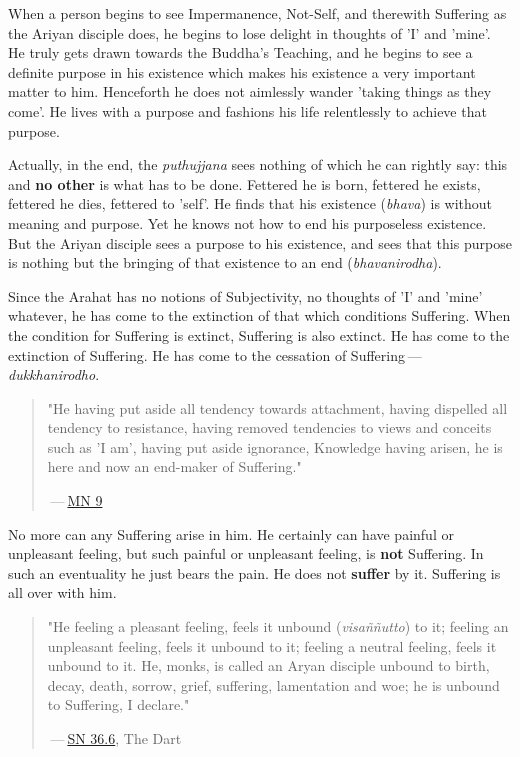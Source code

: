 When a person begins to see Impermanence, Not-Self, and therewith Suffering as the Ariyan disciple does, he begins to lose delight in thoughts of 'I' and 'mine'. He truly gets drawn towards the Buddha's Teaching, and he begins to see a definite purpose in his existence which makes his existence a very important matter to him. Henceforth he does not aimlessly wander 'taking things as they come'. He lives with a purpose and fashions his life relentlessly to achieve that purpose.

Actually, in the end, the \emph{puthujjana} sees nothing of which he can rightly say: this and \textbf{no other} is what has to be done. Fettered he is born, fettered he exists, fettered he dies, fettered to 'self'. He finds that his existence (\emph{bhava}) is without meaning and purpose. Yet he knows not how to end his purposeless existence. But the Ariyan disciple sees a purpose to his existence, and sees that this purpose is nothing but the bringing of that existence to an end (\emph{bhavanirodha}).

Since the Arahat has no notions of Subjectivity, no thoughts of 'I' and 'mine' whatever, he has come to the extinction of that which conditions Suffering. When the condition for Suffering is extinct, Suffering is also extinct. He has come to the extinction of Suffering. He has come to the cessation of Suffering --- \emph{dukkhanirodho}.

\begin{quote}
"He having put aside all tendency towards attachment, having dispelled all tendency to resistance, having removed tendencies to views and conceits such as 'I am', having put aside ignorance, Knowledge having arisen, he is here and now an end-maker of Suffering."

 --- \href{https://suttacentral.net/mn9/en/bodhi}{MN 9}
\end{quote}

No more can any Suffering arise in him. He certainly can have painful or unpleasant feeling, but such painful or unpleasant feeling, is \textbf{not} Suffering. In such an eventuality he just bears the pain. He does not \textbf{suffer} by it. Suffering is all over with him.

\begin{quote}
"He feeling a pleasant feeling, feels it unbound (\emph{visaññutto}) to it; feeling an unpleasant feeling, feels it unbound to it; feeling a neutral feeling, feels it unbound to it. He, monks, is called an Aryan disciple unbound to birth, decay, death, sorrow, grief, suffering, lamentation and woe; he is unbound to Suffering, I declare."

 --- \href{https://suttacentral.net/sn36.6/en/bodhi}{SN 36.6}, The Dart
\end{quote}

